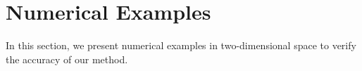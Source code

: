 \documentclass[12pt]{article}
\begin{document}

\section{Numerical Examples}
In this section, we present numerical examples in two-dimensional space to verify the accuracy of our method.
\end{document}
